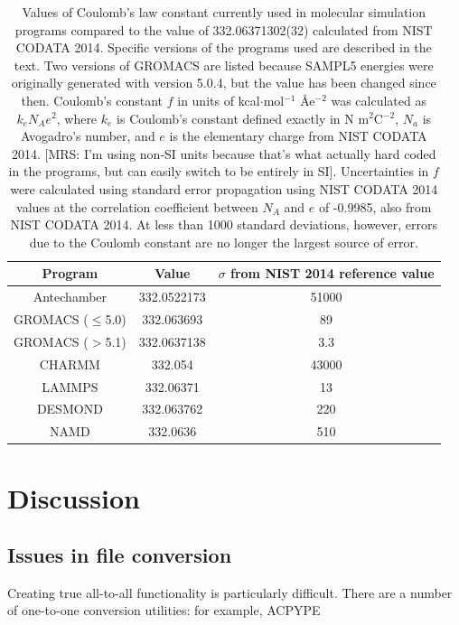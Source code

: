 \begin{table}
\caption{Values of Coulomb's law constant currently used in molecular
  simulation programs compared to the value of 332.06371302(32)
  calculated from NIST CODATA 2014. Specific versions of the programs
  used are described in the text. Two versions of GROMACS are listed
  because SAMPL5 energies were originally generated with version
  5.0.4, but the value has been changed since then. Coulomb's constant
  $f$ in units of kcal$\cdot$mol$^{-1}$ \AA e$^{-2}$ was calculated as
  $k_e N_A e^2$, where $k_e$ is Coulomb's constant defined exactly in
  N m$^2$C$^{-2}$, $N_a$ is Avogadro's number, and $e$ is the
  elementary charge from NIST CODATA 2014. [MRS: I'm using non-SI
    units because that's what actually hard coded in the programs, but
    can easily switch to be entirely in SI]. Uncertainties in $f$ were
  calculated using standard error propagation using NIST CODATA 2014
  values at the correlation coefficient between $N_A$ and $e$ of
  -0.9985, also from NIST CODATA 2014. At less than 1000 standard
  deviations, however, errors due to the Coulomb constant are no
  longer the largest source of error.\label{tab:delfromnist}}
\begin{tabular}{|ccc|}
\hline
Program & Value & $\sigma$ from NIST 2014 reference value \\
\hline
Antechamber &  332.0522173 & 51000 \\
GROMACS ($\leq$5.0) & 332.063693 & 89 \\
GROMACS ($>$5.1) & 332.0637138 & 3.3 \\ 
CHARMM & 332.054 & 43000 \\
LAMMPS & 332.06371 &  13 \\
DESMOND & 332.063762 & 220 \\
NAMD & 332.0636 & 510 \\
\hline
\end{tabular}
\end{table}

\section*{Discussion}

\subsection*{Issues in file conversion}
Creating true all-to-all functionality is particularly
difficult. There are a number of one-to-one conversion utilities: for
example, ACPYPE~\cite{sousa_da_silva_acpype_2012}

